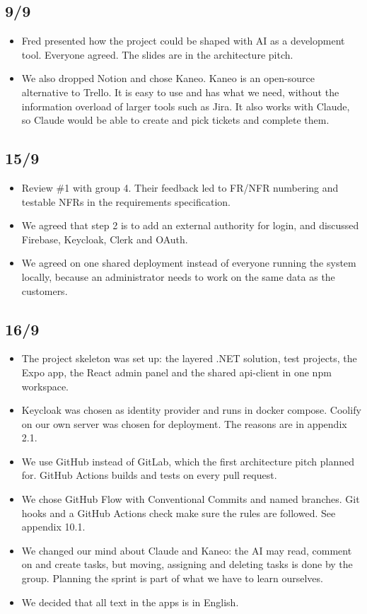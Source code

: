\documentclass[a4paper,11pt]{article}
\begin{document}
\subsection*{9/9}
\begin{itemize}
    \item Fred presented how the project could be shaped with AI as a development tool. Everyone agreed. The slides are in the architecture pitch.
    \item We also dropped Notion and chose Kaneo. Kaneo is an open-source alternative to Trello. It is easy to use and has what we need, without the information overload of larger tools such as Jira. It also works with Claude, so Claude would be able to create and pick tickets and complete them.
\end{itemize}

\subsection*{15/9}
\begin{itemize}
    \item Review \#1 with group 4. Their feedback led to FR/NFR numbering and testable NFRs in the requirements specification.
    \item We agreed that step 2 is to add an external authority for login, and discussed Firebase, Keycloak, Clerk and OAuth.
    \item We agreed on one shared deployment instead of everyone running the system locally, because an administrator needs to work on the same data as the customers.
\end{itemize}

\subsection*{16/9}
\begin{itemize}
    \item The project skeleton was set up: the layered .NET solution, test projects, the Expo app, the React admin panel and the shared api-client in one npm workspace.
    \item Keycloak was chosen as identity provider and runs in docker compose. Coolify on our own server was chosen for deployment. The reasons are in appendix 2.1.
    \item We use GitHub instead of GitLab, which the first architecture pitch planned for. GitHub Actions builds and tests on every pull request.
    \item We chose GitHub Flow with Conventional Commits and named branches. Git hooks and a GitHub Actions check make sure the rules are followed. See appendix 10.1.
    \item We changed our mind about Claude and Kaneo: the AI may read, comment on and create tasks, but moving, assigning and deleting tasks is done by the group. Planning the sprint is part of what we have to learn ourselves.
    \item We decided that all text in the apps is in English.
\end{itemize}
\end{document}
